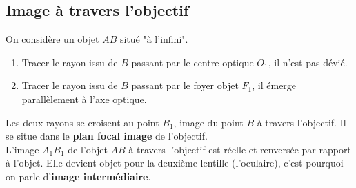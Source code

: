 \documentclass[a4paper,11pt,fleqn]{article}%
\begin{document}
		
		\subsection{Image à travers l'objectif}
		On considère un objet $AB$ situé "à l'infini".
		\begin{enumerate}
			\item Tracer le rayon issu de $B$ passant par le centre optique $O_1$, il n'est pas dévié.
			\item Tracer le rayon issu de $B$ passant par le foyer objet $F_1$, il émerge parallèlement à l'axe optique.
		\end{enumerate}
		Les deux rayons se croisent au  point $B_1$, image du point $B$ à travers l'objectif. Il se situe dans le \textbf{plan focal image} de l'objectif.\\
		L'image $A_1B_1$ de l'objet $AB$ à travers l'objectif est réelle et renversée par rapport à l'objet. Elle devient objet pour la deuxième lentille (l'oculaire), c'est pourquoi on parle d'\textbf{image intermédiaire}.
		
\end{document}
